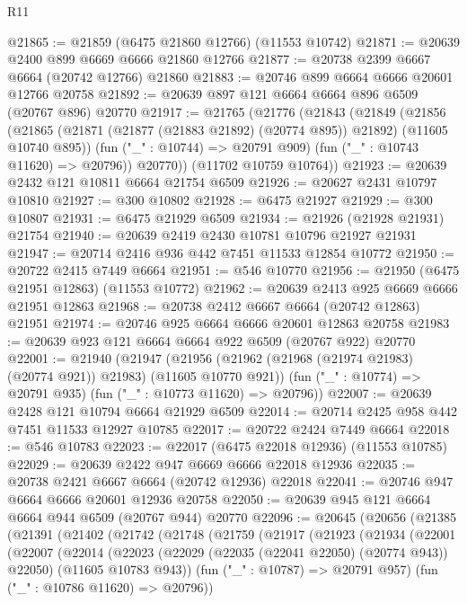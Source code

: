 \begin{lexlean}{R11}
\begin{coremodule}
{{{{{{{{{{{{{{{{{{{{{{{{{{{{{{{{{{{{{{{{{{{{{{{{{{{{{{{{{{{{{{{{{{{{{{{{{{{{{{{{{{@21865 := @21859 (@6475 @21860 @12766) (@11553 @10742)
@21871 := @20639 @2400 @899 @6669 @6666 @21860 @12766
@21877 := @20738 @2399 @6667 @6664 (@20742 @12766) @21860
@21883 := @20746 @899 @6664 @6666 @20601 @12766 @20758
@21892 := @20639 @897 @121 @6664 @6664 @896 @6509 (@20767 @896) @20770
@21917 := @21765
    (@21776
      (@21843
        (@21849
          (@21856
            (@21865 (@21871 (@21877 (@21883 @21892) (@20774 @895)) @21892) (@11605 @10740 @895))
            (fun ("_" : @10744) => @20791 @909)
            (fun ("_" : @10743 @11620) => @20796))
          @20770))
      (@11702 @10759 @10764))
@21923 := @20639 @2432 @121 @10811 @6664 @21754 @6509
@21926 := @20627 @2431 @10797 @10810
@21927 := @300 @10802
@21928 := @6475 @21927
@21929 := @300 @10807
@21931 := @6475 @21929 @6509
@21934 := @21926 (@21928 @21931) @21754
@21940 := @20639 @2419 @2430 @10781 @10796 @21927 @21931
@21947 := @20714 @2416 @936 @442 @7451 @11533 @12854 @10772
@21950 := @20722 @2415 @7449 @6664
@21951 := @546 @10770
@21956 := @21950 (@6475 @21951 @12863) (@11553 @10772)
@21962 := @20639 @2413 @925 @6669 @6666 @21951 @12863
@21968 := @20738 @2412 @6667 @6664 (@20742 @12863) @21951
@21974 := @20746 @925 @6664 @6666 @20601 @12863 @20758
@21983 := @20639 @923 @121 @6664 @6664 @922 @6509 (@20767 @922) @20770
@22001 := @21940
    (@21947
      (@21956 (@21962 (@21968 (@21974 @21983) (@20774 @921)) @21983) (@11605 @10770 @921))
      (fun ("_" : @10774) => @20791 @935)
      (fun ("_" : @10773 @11620) => @20796))
@22007 := @20639 @2428 @121 @10794 @6664 @21929 @6509
@22014 := @20714 @2425 @958 @442 @7451 @11533 @12927 @10785
@22017 := @20722 @2424 @7449 @6664
@22018 := @546 @10783
@22023 := @22017 (@6475 @22018 @12936) (@11553 @10785)
@22029 := @20639 @2422 @947 @6669 @6666 @22018 @12936
@22035 := @20738 @2421 @6667 @6664 (@20742 @12936) @22018
@22041 := @20746 @947 @6664 @6666 @20601 @12936 @20758
@22050 := @20639 @945 @121 @6664 @6664 @944 @6509 (@20767 @944) @20770
@22096 := @20645
    (@20656
      (@21385
        (@21391
          (@21402
            (@21742
              (@21748
                (@21759
                  (@21917
                    (@21923
                      (@21934
                        (@22001
                          (@22007
                            (@22014
                              (@22023
                                (@22029 (@22035 (@22041 @22050) (@20774 @943)) @22050)
                                (@11605 @10783 @943))
                              (fun ("_" : @10787) => @20791 @957)
                              (fun ("_" : @10786 @11620) => @20796))
}}}}}}}}}}}}}}}}}}}}}}}}}}}}}}}}}}}}}}}}}}}}}}}}}}}}}}}}}}}}}}}}}}}}}}}}}}}}}}}}}}
\end{coremodule}
\end{lexlean}
